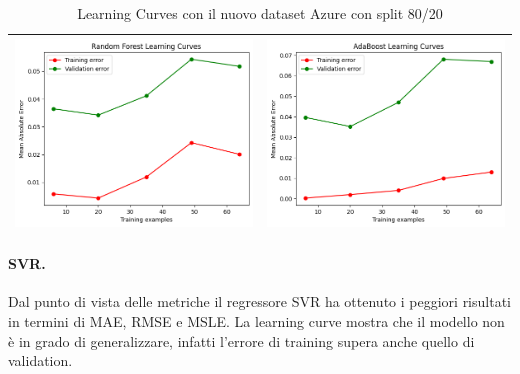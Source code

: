 \begin{table}[H]
\begin{tabularx}{\textwidth}{|X|X|}
        \includegraphics[width=\linewidth, trim=0 0 0 0]{images/RandomForest_lc80_Azure.png} &
        \includegraphics[width=\linewidth, trim=0 0 0 0]{images/AdaBoost_lc80_Azure.png} \\
        \hline
    \end{tabularx}
    \caption{Learning Curves con il nuovo dataset Azure con split 80/20}
    \label{tab:emissions_info}
\end{table}

\paragraph{\textbf{SVR}.}
Dal punto di vista delle metriche il regressore SVR ha ottenuto i peggiori risultati in termini di MAE, RMSE e MSLE. La learning curve mostra che il modello non è in grado di generalizzare, infatti l'errore di training supera anche quello di validation.

